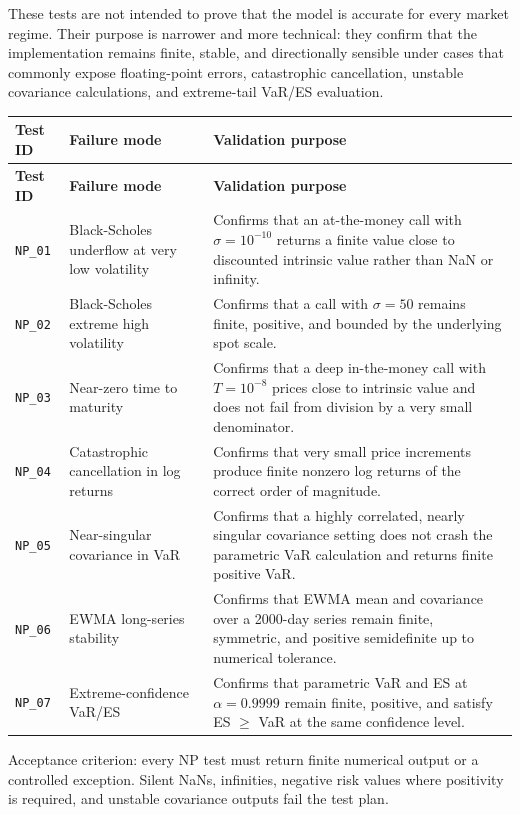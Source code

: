 \documentclass[11pt]{article}
\newcommand{\code}[1]{\texttt{#1}}
\begin{document}
These tests are not intended to prove that the model is accurate for every
market regime.  Their purpose is narrower and more technical: they confirm
that the implementation remains finite, stable, and directionally sensible
under cases that commonly expose floating-point errors, catastrophic
cancellation, unstable covariance calculations, and extreme-tail VaR/ES
evaluation.

\begin{longtable}{L{2.2cm}L{4.4cm}L{6.2cm}}
\toprule
\textbf{Test ID} & \textbf{Failure mode} & \textbf{Validation purpose} \\
\midrule
\endfirsthead
\toprule
\textbf{Test ID} & \textbf{Failure mode} & \textbf{Validation purpose} \\
\midrule
\endhead
\bottomrule
\endfoot
\code{NP\_01} & Black-Scholes underflow at very low volatility & Confirms that an at-the-money call with $\sigma = 10^{-10}$ returns a finite value close to discounted intrinsic value rather than NaN or infinity. \\
\code{NP\_02} & Black-Scholes extreme high volatility & Confirms that a call with $\sigma = 50$ remains finite, positive, and bounded by the underlying spot scale. \\
\code{NP\_03} & Near-zero time to maturity & Confirms that a deep in-the-money call with $T = 10^{-8}$ prices close to intrinsic value and does not fail from division by a very small denominator. \\
\code{NP\_04} & Catastrophic cancellation in log returns & Confirms that very small price increments produce finite nonzero log returns of the correct order of magnitude. \\
\code{NP\_05} & Near-singular covariance in VaR & Confirms that a highly correlated, nearly singular covariance setting does not crash the parametric VaR calculation and returns finite positive VaR. \\
\code{NP\_06} & EWMA long-series stability & Confirms that EWMA mean and covariance over a 2000-day series remain finite, symmetric, and positive semidefinite up to numerical tolerance. \\
\code{NP\_07} & Extreme-confidence VaR/ES & Confirms that parametric VaR and ES at $\alpha = 0.9999$ remain finite, positive, and satisfy ES $\geq$ VaR at the same confidence level. \\
\end{longtable}

Acceptance criterion: every NP test must return finite numerical output
or a controlled exception.  Silent NaNs, infinities, negative risk values
where positivity is required, and unstable covariance outputs fail the
test plan.
\end{document}

